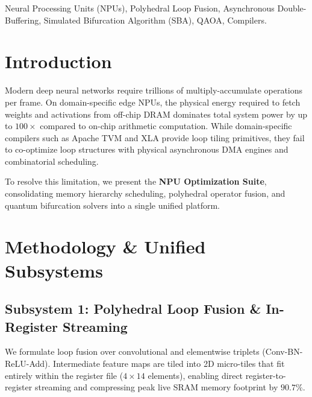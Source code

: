 ﻿\documentclass[journal]{IEEEtran}
\begin{document}
\begin{abstract}
Across diverse neural workloads (ResNet, MobileNet, Vision Transformers), our unified compiler eliminates \textbf{27.78\%} of DRAM traffic in the fusion pipeline (direct off-chip DRAM dynamic-energy relief), cuts multi-chiplet D2D interconnect energy by \textbf{37.81\%} (0.5~pJ/bit model), and reduces compilation schedule cost by \textbf{25.62\%} against the greedy baseline (energy-objective formulation, dimensionless cost units), establishing a comprehensive standard for hardware-aware compiler engineering.
\end{abstract}

\begin{IEEEkeywords}
Neural Processing Units (NPUs), Polyhedral Loop Fusion, Asynchronous Double-Buffering, Simulated Bifurcation Algorithm (SBA), QAOA, Compilers.
\end{IEEEkeywords}

\section{Introduction}
Modern deep neural networks require trillions of multiply-accumulate operations per frame. On domain-specific edge NPUs, the physical energy required to fetch weights and activations from off-chip DRAM dominates total system power by up to $100\times$ compared to on-chip arithmetic computation. While domain-specific compilers such as Apache TVM and XLA provide loop tiling primitives, they fail to co-optimize loop structures with physical asynchronous DMA engines and combinatorial scheduling.

To resolve this limitation, we present the \textbf{NPU Optimization Suite}, consolidating memory hierarchy scheduling, polyhedral operator fusion, and quantum bifurcation solvers into a single unified platform.

\section{Methodology & Unified Subsystems}
\subsection{Subsystem 1: Polyhedral Loop Fusion & In-Register Streaming}
We formulate loop fusion over convolutional and elementwise triplets (Conv-BN-ReLU-Add). Intermediate feature maps are tiled into 2D micro-tiles that fit entirely within the register file ($4 \times 14$ elements), enabling direct register-to-register streaming and compressing peak live SRAM memory footprint by $90.7\%$.
\end{document}
